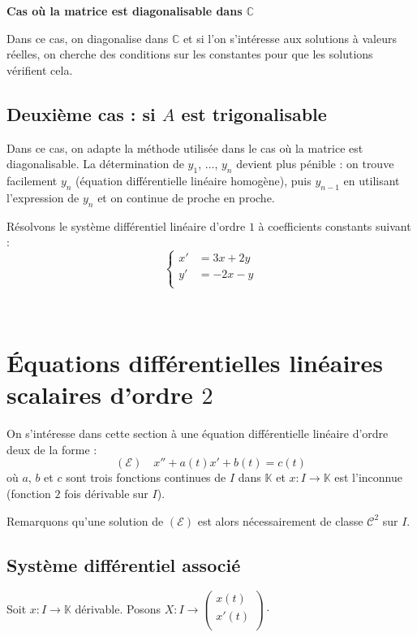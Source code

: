 \documentclass[a4paper,10pt]{report}
\begin{document}
\textbf{Cas où la matrice est diagonalisable dans $\mathbb{C}$} 

Dans ce cas, on diagonalise dans $\mathbb{C}$ et si l'on s'intéresse aux solutions à valeurs réelles, on cherche des conditions sur les constantes pour que les solutions vérifient cela.

\subsection{Deuxième cas : si $A$ est trigonalisable}

Dans ce cas, on adapte la méthode utilisée dans le cas où la matrice est diagonalisable. La détermination de $y_1$, $\ldots$, $y_n$ devient plus pénible : on trouve facilement $y_n$ (équation différentielle linéaire homogène), puis $y_{n-1}$ en utilisant l'expression de $y_n$ et on continue de proche en proche. 

\medskip

\begin{Exemple} Résolvons le système différentiel linéaire d'ordre $1$ à coefficients constants suivant : 
$$ \left\lbrace \begin{array}{lll}
    x' & = 3x + 2y \\
    y' & = -2x - y \\
    \end{array}\right.$$
\end{Exemple}

\vspace{10cm}

\newpage

$\phantom{test}$

\vspace{6cm}
\section{Équations différentielles linéaires scalaires d'ordre $2$}

On s'intéresse dans cette section à une équation différentielle linéaire d'ordre deux de la forme :
$$ (\mathcal{E}) \quad x''+a(t)x'+b(t)=c(t)$$
où $a$, $b$ et $c$ sont trois fonctions continues de $I$ dans $\mathbb{K}$ et $x : I \rightarrow \mathbb{K}$ est l'inconnue (fonction $2$ fois dérivable sur $I$).

\medskip

Remarquons qu'une solution de $(\mathcal{E})$ est alors nécessairement de classe $\mathcal{C}^2$ sur $I$.


\subsection{Système différentiel associé}
Soit $x : I \rightarrow \mathbb{K}$ dérivable. Posons $X : I \rightarrow \begin{pmatrix}
x(t) \\
x'(t) \\
\end{pmatrix} \cdot$
\end{document}
